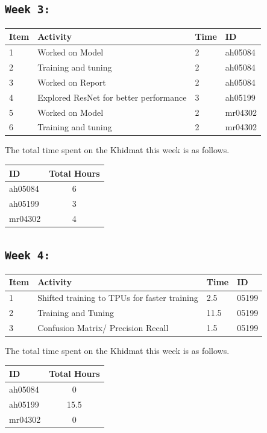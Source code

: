 \documentclass{article}
\begin{document}
\subsection{\texttt{Week 3: }}
\begin{center}
\begin{tabular}{|l|l|l|l|}
  \hline
  \textbf{Item} 	& \textbf{Activity} & \textbf{Time} & \textbf{ID} \\\hline
  1 & Worked on Model & 2 & ah05084 \\ \hline
  2 & Training and tuning & 2 & ah05084 \\ \hline
  3 & Worked on Report & 2 & ah05084 \\ \hline
  4 & Explored ResNet for better performance & 3 & ah05199 \\ \hline
  5 & Worked on Model & 2 & mr04302 \\ \hline
  6 & Training and tuning & 2 & mr04302 \\ \hline
\end{tabular}
    
\end{center}
The total time spent on the Khidmat this week is as follows.    

\begin{center}
\begin{tabular}{|l|c|}
  \hline
  \textbf{ID} & \textbf{Total Hours}\\\hline
  ah05084 & 6 \\\hline
  ah05199 & 3 \\\hline
  mr04302 & 4 \\\hline
\end{tabular}
\end{center}
\newpage
\subsection{\texttt{Week 4: }}
\begin{center}
\begin{tabular}{|l|l|l|l|}
  \hline
  \textbf{Item} 	& \textbf{Activity} & \textbf{Time} & \textbf{ID} \\\hline
  
  1 & Shifted training to TPUs for faster training & 2.5 & 05199 \\ \hline
  2 & Training and Tuning & 11.5 & 05199 \\ \hline
  3 & Confusion Matrix/ Precision Recall & 1.5 & 05199 \\ \hline
\end{tabular}
    
\end{center}
The total time spent on the Khidmat this week is as follows.    
\begin{center}
\begin{tabular}{|l|c|}
  \hline
  \textbf{ID} & \textbf{Total Hours}\\\hline
  ah05084 & 0 \\\hline
  ah05199 & 15.5 \\\hline
  mr04302 & 0 \\\hline
\end{tabular}
\end{center}
\newpage
\end{document}
